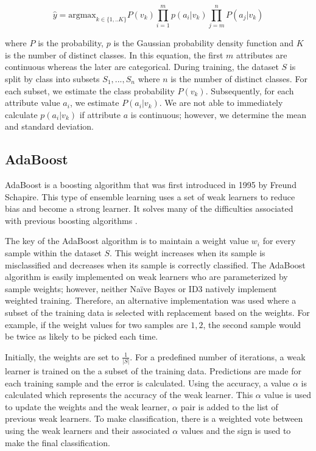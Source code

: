 \documentclass[11pt]{article}
\begin{document}
$$\hat{y}= \mathrm{argmax}_{k\in\{1,..K\}} P(v_k)\prod_{i=1}^mp\left(a_i|v_k\right)\prod_{j=m}^nP\left(a_j|v_k\right)$$

where $P$ is the probability, $p$ is the Gaussian probability density function and $K$ is the number of distinct classes. In this equation, the first $m$ attributes are continuous whereas the later are categorical. During training, the dataset $S$ is split by class into subsets ${S_1,...,S_n}$ where $n$ is the number of distinct classes. For each subset, we estimate the class probability $P(v_k)$. Subsequently, for each attribute value $a_i$, we estimate $P(a_i|v_k)$. We are not able to immediately calculate $p(a_i|v_k)$ if attribute $a$ is continuous; however, we determine the mean and standard deviation.

\subsection{AdaBoost} \label{adaboost}
AdaBoost is a boosting algorithm that was first introduced in 1995 by Freund Schapire. This type of ensemble learning uses a set of weak learners to reduce bias and become a strong learner. It solves many of the difficulties associated with previous boosting algorithms \cite{Schapire:1999:BIB:1624312.1624417}.

The key of the AdaBoost algorithm is to maintain a weight value $w_i$ for every sample within the dataset $S$. This weight increases when its sample is misclassified and decreases when its sample is correctly classified. The AdaBoost algorithm is easily implemented on weak learners who are parameterized by sample weights; however, neither Naïve Bayes or ID3 natively implement weighted training. Therefore, an alternative implementation was used where a subset of the training data is selected with replacement based on the weights. For example, if the weight values for two samples are ${1, 2}$, the second sample would be twice as likely to be picked each time.

Initially, the weights are set to $\frac{1}{|S|}$. For a predefined number of iterations, a weak learner is trained on the a subset of the training data. Predictions are made for each training sample and the error is calculated. Using the accuracy, a value $\alpha$ is calculated which represents the accuracy of the weak learner. This $\alpha$ value is used to update the weights and the weak learner, $\alpha$ pair is added to the list of previous weak learners. To make classification, there is a weighted vote between using the weak learners and their associated $\alpha$ values and the sign is used to make the final classification.
\end{document}
